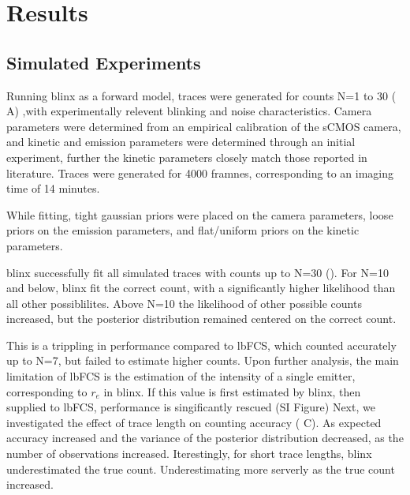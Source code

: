 \section{Results}

\subsection{Simulated Experiments}
Running blinx as a forward model, traces were generated for counts N=1 to 30
	( A) ,with experimentally relevent blinking and noise characteristics.
	Camera parameters were determined from an empirical calibration of the
	sCMOS camera, and kinetic and emission parameters were determined through an
	initial experiment, further the kinetic parameters closely match those reported
	in literature.
	Traces were generated for 4000 framnes, corresponding to an imaging time of 
	14 minutes.

While fitting, tight gaussian priors were placed on the camera parameters,
	loose priors on the emission parameters, and flat/uniform priors on the
	kinetic parameters. 

blinx successfully fit all simulated traces with counts up to N=30 (\figref{}).
	For N=10 and below, blinx fit the correct count, with a significantly higher
	likelihood than all other possiblilites. Above N=10 the likelihood of other 
	possible counts increased, but the posterior distribution remained
	centered on the correct count.

This is a trippling in performance compared to lbFCS, which counted accurately up
	to N=7, but failed to estimate higher counts.
	Upon further analysis, the main limitation of lbFCS is the estimation of the 
	intensity of a single emitter, corresponding to $r_e$ in blinx. If this value is 
	first estimated by blinx, then supplied to lbFCS, performance is singificantly 
	rescued (SI Figure)
Next, we investigated the effect of trace length on counting accuracy ( C).
	As expected accuracy increased and the variance of the posterior distribution decreased, 
	as the number of observations increased.
	Iterestingly, for short trace lengths, blinx underestimated the true count. Underestimating 
	more serverly as the true count increased.

